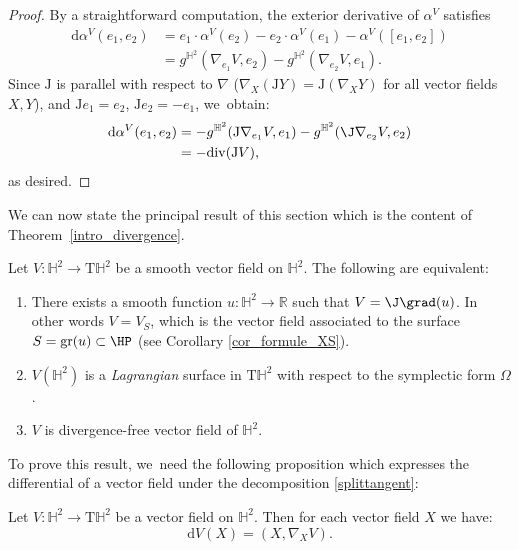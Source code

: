 \begin{proof}
By a straightforward computation, the exterior derivative of \(\alpha^V \) satisfies
\begin{align*}
\mathrm{d} \alpha^V(e_1, e_2)
&= e_1 \cdot \alpha^V(e_2) - e_2 \cdot \alpha^V(e_1) - \alpha^V([e_1, e_2]) \\
&= g^{\mathbb{H}^2}(\nabla_{e_1} V, e_2) - g^{\mathbb{H}^2}(\nabla_{e_2} V, e_1).
\end{align*}
Since \(\mathrm{J} \) is parallel with respect to \(\nabla \) (\ie \(\nabla_X (\mathrm{J}Y) = \mathrm{J}(\nabla_X Y) \) for all vector fields \(X, Y \)), and \(\mathrm{J}e_1 = e_2 \), \(\mathrm{J}e_2 = -e_1 \), we~obtain:
\begin{align*}
\mathrm{d} \alpha^V(e_1, e_2)
&= -g^{\mathbb{H}^2}(\mathrm{J} \nabla_{e_1} V, e_1) - g^{\mathbb{H}^2}(\J\nabla_{e_2} V, e_2) \\
&= -\mathrm{div}(\mathrm{J}V),
\end{align*}
as desired.
\end{proof}

We can now state the principal result of this section which is the content of Theorem~\ref{intro_divergence}.
\begin{theorem}\label{Lagrange_vs_divergence_free}
Let $V:\mathbb{H}^2\to\mathrm{T}\mathbb{H}^2$ be a smooth vector field on $\mathbb{H}^2$. The following are equivalent:
\begin{enumerate}
\item\label{Lagrange_vs_divergence_free1} There exists a smooth function $u:\mathbb{H}^2\to\mathbb{R}$ such that $V=\J\grad(u)$. In other words $V=V_S$, which is the vector field associated to the surface $S=\mathrm{gr}(u)\subset\HP$ (see Corollary \ref{cor_formule_XS}).
\item\label{Lagrange_vs_divergence_free2} $V(\mathbb{H}^2)$ is a \emph{Lagrangian} surface in $\mathrm{T}\mathbb{H}^2$ with respect to the symplectic form $\Omega$.
\item\label{Lagrange_vs_divergence_free3} $V$ is divergence-free vector field of $\mathbb{H}^2$.
\end{enumerate}
\end{theorem}
To prove this result, we~need the following proposition which expresses the differential of a vector field under the decomposition \eqref{splittangent}:
\begin{prop}\label{dV(X)}
Let $V:\mathbb{H}^2\to\mathrm{T}\mathbb{H}^2$ be a vector field on $\mathbb{H}^2$. Then for each vector field $X$ we have:
\[
\mathrm{d}V(X)=(X,\nabla_XV).
\]
\end{prop}

